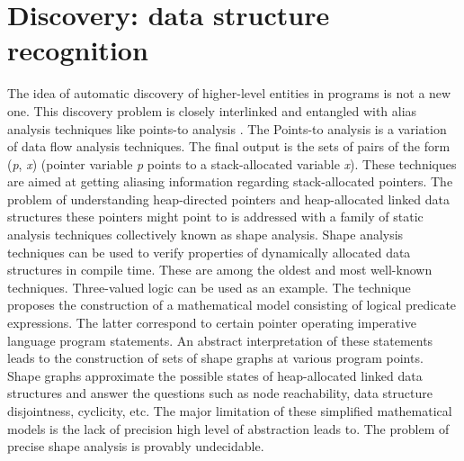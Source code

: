 \section{Discovery: data structure recognition}
\label{related_work_dcp}
\quad The idea of automatic discovery of higher-level entities in programs is not a new one. This discovery problem is closely interlinked and entangled with alias analysis techniques \cite{Muchnick:1998:ACD:286076} like points-to analysis \cite{Emami:1994:CIP:178243.178264}. The Points-to analysis is a variation of data flow analysis techniques. The final output is the sets of pairs of the form (\textit{p}, \textit{x}) (pointer variable \textit{p} points to a stack-allocated variable \textit{x}). These techniques are aimed at getting aliasing information regarding stack-allocated pointers.\newline\null
\quad The problem of understanding heap-directed pointers and heap-allocated linked data structures these pointers might point to is addressed with a family of static analysis techniques collectively known as shape analysis. Shape analysis techniques can be used to verify properties of dynamically allocated data structures in compile time. These are among the oldest and most well-known techniques. Three-valued logic \cite{Sagiv:1999:PSA:292540.292552}\cite{Wilhelm:2000:SA:647476.760384} can be used as an example. The technique proposes the construction of a mathematical model consisting of logical predicate expressions. The latter correspond to certain pointer operating imperative language program statements. An abstract interpretation of these statements leads to the construction of sets of shape graphs at various program points. Shape graphs approximate the possible states of heap-allocated linked data structures and answer the questions such as node reachability, data structure disjointness, cyclicity, etc. The major limitation of these simplified mathematical models is the lack of precision high level of abstraction leads to. The problem of precise shape analysis is provably undecidable.\newline\null
